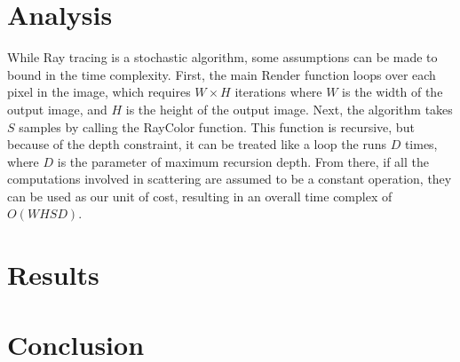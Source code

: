 \documentclass{IEEEtran}
\begin{document}
\section*{Analysis}

While Ray tracing is a stochastic algorithm, some assumptions can be made to bound in the time
complexity. First, the main Render function loops over each pixel in the image, which requires
$W\times H$ iterations where $W$ is the width of the output image, and $H$ is the height of the
output image. Next, the algorithm takes $S$ samples by calling the RayColor function. This function
is recursive, but because of the depth constraint, it can be treated like a loop the runs $D$ times,
where $D$ is the parameter of maximum recursion depth. From there, if all the computations involved
in scattering are assumed to be a constant operation, they can be used as our unit of cost,
resulting in an overall time complex of $O(WHSD)$.

\section*{Results}

\section*{Conclusion}

\printbibliography

\end{document}
